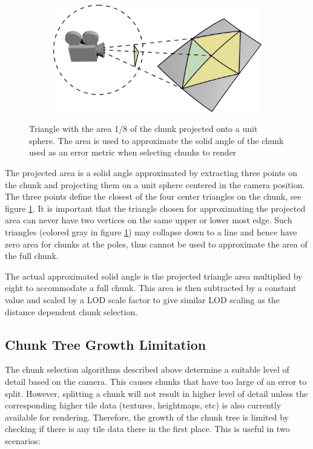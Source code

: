 \begin{figure}[htbp]
    \centering
    \begin{subfigure}[bt]{0.5\textwidth}
        \includegraphics[width=\textwidth]{figures/implementation/chunklod/projectedarea.png}
    \end{subfigure}
    \caption{Triangle with the area 1/8 of the chunk projected onto a unit sphere. The area is used to approximate the solid angle of the chunk used as an error metric when selecting chunks to render}
    \label{fig:chunkprojarea}
\end{figure}

The projected area is a solid angle approximated by extracting three points on the chunk and projecting them on a unit sphere centered in the camera position. The three points define the closest of the four center triangles on the chunk, see figure \ref{fig:chunkprojarea}. It is important that the triangle chosen for approximating the projected area can never have two vertices on the same upper or lower most edge. Such triangles (colored gray in figure \ref{fig:chunkprojarea}) may collapse down to a line and hence have zero area for chunks at the poles, thus cannot be used to approximate the area of the full chunk.

The actual approximated solid angle is the projected triangle area multiplied by eight to accommodate a full chunk. This area is then subtracted by a constant value and scaled by a LOD scale factor to give similar LOD scaling as the distance dependent chunk selection.

\subsection{Chunk Tree Growth Limitation}
The chunk selection algorithms described above determine a suitable level of detail based on the camera. This causes chunks that have too large of an error to split. However, splitting a chunk will not result in higher level of detail unless the corresponding higher tile data (textures, heightmaps, etc) is also currently available for rendering. Therefore, the growth of the chunk tree is limited by checking if there is any tile data there in the first place. This is useful in two scenarios:

